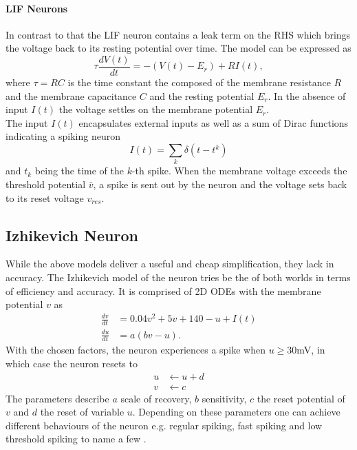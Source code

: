 \paragraph{\ac{LIF} Neurons}
In contrast to that the \ac{LIF} neuron contains a leak term on the RHS which brings the voltage back to its resting potential over time. The model can be expressed as
\begin{equation}
	\tau\frac{dV(t)}{dt} = -(V(t)-E_r) + RI(t),
\end{equation}
where $\tau = RC$ is the time constant the composed of the membrane resistance $R$ and the membrane capacitance $C$ and the resting potential $E_r$. In the absence of input $I(t)$ the voltage settles on the membrane potential $E_r$.\\
The input $I(t)$ encapsulates external inputs as well as a sum of Dirac functions indicating a spiking neuron
\begin{equation}
	I(t) = \sum_k \delta(t-t^k)
\end{equation}
and $t_k$ being the time of the $k$-th spike. When the membrane voltage exceeds the threshold potential $\bar{v}$, a spike is sent out by the neuron and the voltage sets back to its reset voltage $v_{res}$.
\subsection{Izhikevich Neuron}
While the above models deliver a useful and cheap simplification, they lack in accuracy. The Izhikevich model \cite{izhikevich_simple_2003} of the neuron tries be the of both worlds in terms of efficiency and accuracy. It is comprised of 2D ODEs with the membrane potential $v$ as
\begin{equation}
	\begin{aligned}
	\frac{d v}{dt} &= 0.04v^2 + 5v + 140 -u +I(t)\\
	\frac{d u}{dt} &= a(bv-u).
	\end{aligned}
\end{equation}
With the chosen factors, the neuron experiences a spike when $u\geq30 $mV, in which case the neuron resets to
\begin{equation}
\begin{aligned}
	u &\leftarrow u+d\\
	v&\leftarrow c
\end{aligned}
\end{equation}
The parameters describe $a$ scale of recovery, $b$ sensitivity, $c$ the reset potential of $v$ and $d$ the reset of variable $u$. Depending on these parameters one can achieve different behaviours of the neuron e.g. regular spiking, fast spiking and low threshold spiking to name a few \cite{izhikevich_simple_2003}.

